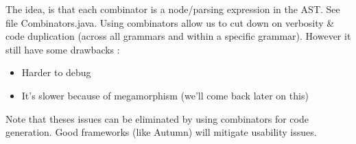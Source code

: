         The idea, is that each combinator is a node/parsing expression in the
        AST. See file Combinators.java. Using combinators allow us to cut down
        on verbosity \& code duplication (across all grammars and within a
        specific grammar). However it still have some drawbacks : 
        \begin{itemize}
            \item Harder to debug
            \item It's slower because of megamorphism (we'll come back later on
            this)
        \end{itemize}
        Note that theses issues can be eliminated by using combinators for code
        generation. Good frameworks (like Autumn) will mitigate usability
        issues.